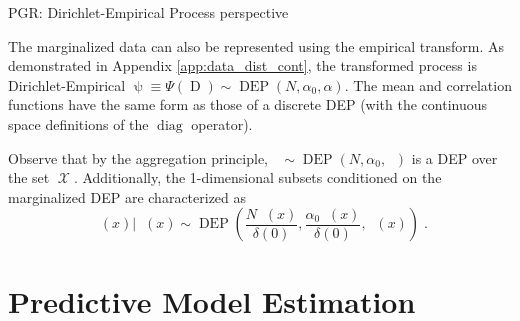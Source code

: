 \documentclass[12pt]{report}
\DeclareMathOperator{\diag}{\mathrm{diag}}
\DeclareMathOperator{\Drm}{\mathrm{D}}
\DeclareMathOperator{\Erm}{\mathrm{E}}
\DeclareMathOperator{\Xcal}{\mathcal{X}}
\DeclareMathOperator{\DEP}{\mathrm{DEP}}
\DeclareMathOperator{\uppsim}{\uppsi_\text{m}}
\DeclareMathOperator{\uppsic}{\uppsi_\text{c}}
\DeclareMathOperator{\alpham}{\alpha_\text{m}}
\DeclareMathOperator{\alphac}{\alpha_\text{c}}
\begin{document}
PGR: Dirichlet-Empirical Process perspective

The marginalized data can also be represented using the empirical transform. As demonstrated in Appendix \ref{app:data_dist_cont}, the transformed process is Dirichlet-Empirical $\uppsi \equiv \Psi(\Drm) \sim \DEP(N,\alpha_0,\alpha)$. The mean and correlation functions have the same form as those of a discrete DEP (with the continuous space definitions of the $\diag$ operator).


Observe that by the aggregation principle, $\uppsim \sim \DEP(N,\alpha_0,\alpham)$ is a DEP over the set $\Xcal$. Additionally, the 1-dimensional subsets conditioned on the marginalized DEP are characterized as
\begin{equation}
\uppsic(x) \big| \uppsim(x) \sim \DEP\left( \frac{N \uppsim(x)}{\delta(0)}, \frac{\alpha_0 \alpham(x)}{\delta(0)}, \alphac(x) \right) \;.
\end{equation}











\section{Predictive Model Estimation} \label{sec:predictive_est_cont}
\end{document}
